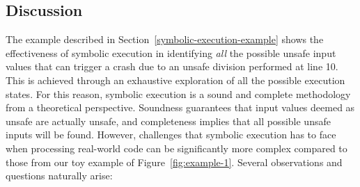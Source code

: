 
\subsection{Discussion}
\label{example-discussion}

The example described in Section~\ref{symbolic-execution-example} shows the effectiveness of symbolic execution in identifying {\em all} the possible unsafe input values that can trigger a crash due to an unsafe division performed at line 10. This is achieved through an exhaustive exploration of all the possible execution states. For this reason, symbolic execution is a sound and complete methodology from a theoretical perspective. Soundness guarantees that input values deemed as unsafe are actually unsafe, and completeness implies that all possible unsafe inputs will be found. However, challenges that symbolic execution has to face when processing real-world code can be significantly more complex compared to those from our toy example of Figure~\ref{fig:example-1}. Several observations and questions naturally arise:

